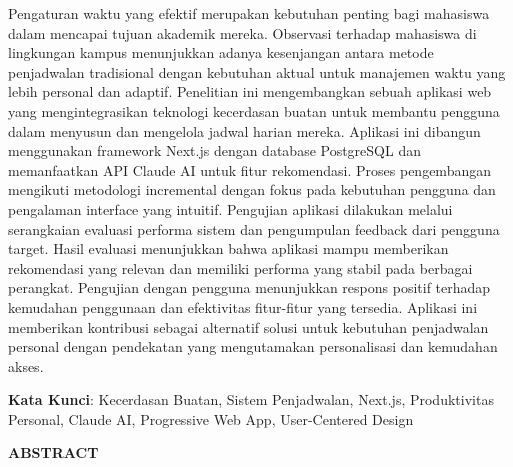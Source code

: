 \documentclass[12pt,a4paper,oneside]{report}
\begin{document}
\begin{singlespace}
Pengaturan waktu yang efektif merupakan kebutuhan penting bagi mahasiswa dalam mencapai tujuan akademik mereka. Observasi terhadap mahasiswa di lingkungan kampus menunjukkan adanya kesenjangan antara metode penjadwalan tradisional dengan kebutuhan aktual untuk manajemen waktu yang lebih personal dan adaptif. Penelitian ini mengembangkan sebuah aplikasi web yang mengintegrasikan teknologi kecerdasan buatan untuk membantu pengguna dalam menyusun dan mengelola jadwal harian mereka. Aplikasi ini dibangun menggunakan framework Next.js dengan database PostgreSQL dan memanfaatkan API Claude AI untuk fitur rekomendasi. Proses pengembangan mengikuti metodologi incremental dengan fokus pada kebutuhan pengguna dan pengalaman interface yang intuitif. Pengujian aplikasi dilakukan melalui serangkaian evaluasi performa sistem dan pengumpulan feedback dari pengguna target. Hasil evaluasi menunjukkan bahwa aplikasi mampu memberikan rekomendasi yang relevan dan memiliki performa yang stabil pada berbagai perangkat. Pengujian dengan pengguna menunjukkan respons positif terhadap kemudahan penggunaan dan efektivitas fitur-fitur yang tersedia. Aplikasi ini memberikan kontribusi sebagai alternatif solusi untuk kebutuhan penjadwalan personal dengan pendekatan yang mengutamakan personalisasi dan kemudahan akses.
\end{singlespace}

\vspace{1cm}
\noindent\textbf{Kata Kunci}: Kecerdasan Buatan, Sistem Penjadwalan, Next.js, Produktivitas Personal, Claude AI, Progressive Web App, User-Centered Design

\newpage
{}
\begin{center}
{\Large\bfseries ABSTRACT}
\end{center}
\end{document}
